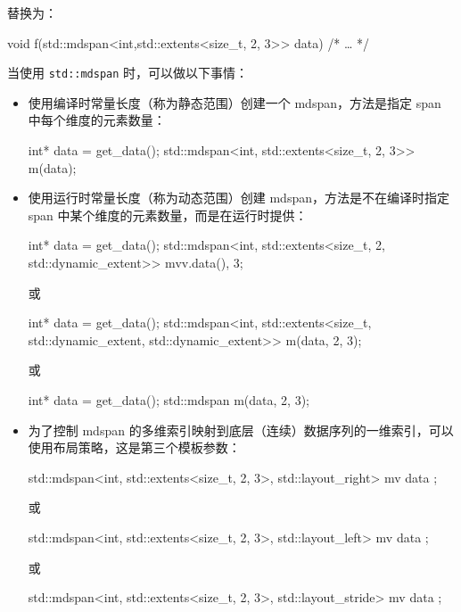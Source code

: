 替换为：

\begin{cpp}
void f(std::mdspan<int,std::extents<size_t, 2, 3>> data)
{ /* … */ }
\end{cpp}

当使用 \verb|std::mdspan| 时，可以做以下事情：

\begin{itemize}
\item
使用编译时常量长度（称为静态范围）创建一个 mdspan，方法是指定 span 中每个维度的元素数量：

\begin{cpp}
int* data = get_data();
std::mdspan<int, std::extents<size_t, 2, 3>> m(data);
\end{cpp}

\item
使用运行时常量长度（称为动态范围）创建 mdspan，方法是不在编译时指定 span 中某个维度的元素数量，而是在运行时提供：

\begin{cpp}
int* data = get_data();
std::mdspan<int, std::extents<size_t,
                              2,
                              std::dynamic_extent>> mv{v.data(), 3};
\end{cpp}

或

\begin{cpp}
int* data = get_data();
std::mdspan<int, std::extents<size_t,
                              std::dynamic_extent,
                              std::dynamic_extent>>
m(data, 2, 3);
\end{cpp}

或

\begin{cpp}
int* data = get_data();
std::mdspan m(data, 2, 3);
\end{cpp}

\item
为了控制 mdspan 的多维索引映射到底层（连续）数据序列的一维索引，可以使用布局策略，这是第三个模板参数：

\begin{cpp}
std::mdspan<int,
            std::extents<size_t, 2, 3>,
            std::layout_right> mv{ data };
\end{cpp}

或

\begin{cpp}
std::mdspan<int,
            std::extents<size_t, 2, 3>,
            std::layout_left> mv{ data };
\end{cpp}

或

\begin{cpp}
std::mdspan<int,
            std::extents<size_t, 2, 3>,
            std::layout_stride> mv{ data };
\end{cpp}
\end{itemize}

